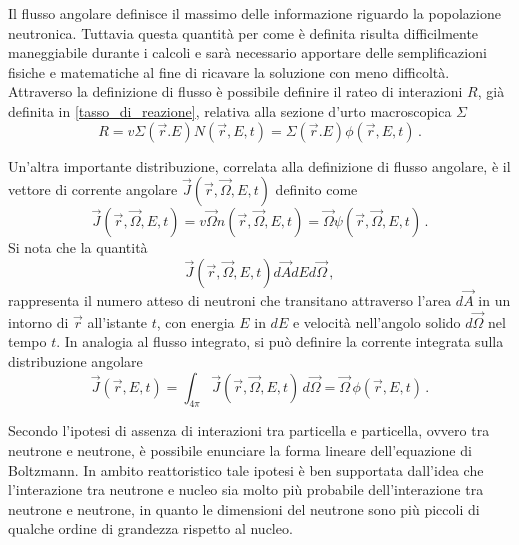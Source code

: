 Il flusso angolare definisce il massimo delle informazione riguardo la 
popolazione neutronica. Tuttavia questa quantità per come è definita risulta 
difficilmente maneggiabile durante i calcoli e sarà necessario apportare delle 
semplificazioni fisiche e matematiche al fine di ricavare la soluzione con meno 
difficoltà.
Attraverso la definizione di flusso è possibile definire il rateo di interazioni 
$R$, già definita in \eqref{tasso_di_reazione}, relativa alla sezione d'urto 
macroscopica $\Sigma$
\begin{equation}
R=v\Sigma(\vec{r}.E)N(\vec{r},E,t)=\Sigma(\vec{r}.E)\phi(\vec{r},E,t) \,.
\end{equation}
 
Un'altra importante distribuzione, correlata alla definizione di flusso 
angolare, è il vettore di corrente angolare $\vec{J}(\vec{r},\vec{\Omega},E,t)$ 
definito come
\begin{equation}
\vec{J}(\vec{r},\vec{\Omega},E,t)=v \vec{\Omega} 
n(\vec{r},\vec{\Omega},E,t)=\vec{\Omega} \psi(\vec{r},\vec{\Omega},E,t) \,.
\end{equation}
Si nota che la quantità
\begin{equation}
\vec{J}(\vec{r},\vec{\Omega},E,t)d\vec{A}dEd\vec{\Omega} \,,
\end{equation}
rappresenta il numero atteso di neutroni che transitano attraverso l'area 
$d\vec{A}$ in un intorno di $\vec{r}$ all'istante $t$, con energia $E$ in $dE$ e 
velocità nell'angolo solido $d\vec{\Omega}$ nel tempo $t$.
In analogia al flusso integrato, si può definire la corrente integrata sulla 
distribuzione angolare
\begin{equation}
\vec{J}(\vec{r},E,t)=\int_{4\pi}\vec{J}(\vec{r},\vec{\Omega},E,t)\, 
d\vec{\Omega}=\vec{\Omega}\,\phi(\vec{r},E,t) \,.
\end{equation}

Secondo l'ipotesi di assenza di interazioni tra particella e particella, ovvero 
tra neutrone e neutrone, è possibile enunciare la forma lineare dell'equazione 
di Boltzmann. In ambito reattoristico tale ipotesi è ben supportata dall'idea 
che l'interazione tra neutrone e nucleo sia molto più probabile dell'interazione 
tra neutrone e neutrone, in quanto le dimensioni del neutrone sono più piccoli 
di qualche ordine di grandezza rispetto al nucleo.

